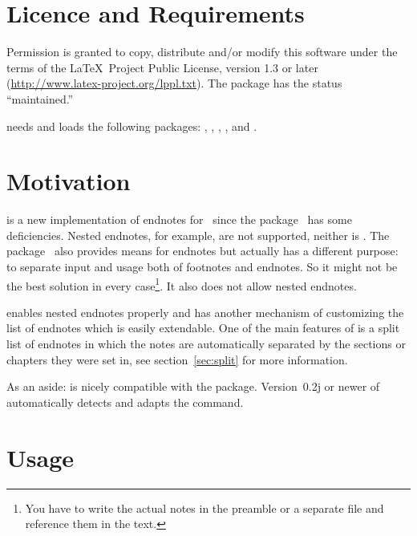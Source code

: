 \documentclass[toc=bib,toc=index]{cnpkgdoc}
\begin{document}
\section{Licence and Requirements}
Permission is granted to copy, distribute and/or modify this software under the
terms of the \LaTeX\ Project Public License, version 1.3 or later
(\url{http://www.latex-project.org/lppl.txt}). The package has the status
``maintained.''

\enotez needs and loads the following packages: , ,
, ,  and .

\section{Motivation}
\enotez is a new implementation of endnotes for \LaTeXe\ since the 
package~\cite{endnotes} has some deficiencies. Nested endnotes, for example, are
not supported, neither is . The  package~\cite{sepfootnotes}
also provides means for endnotes but actually has a different purpose: to
separate input and usage both of footnotes and endnotes. So it might not be the
best solution in every case\footnote{You have to write the actual notes in the
preamble or a separate file and reference them in the text.}. It also does not
allow nested endnotes.

\enotez enables nested endnotes properly and has another mechanism of customizing
the list of endnotes which is easily extendable. One of the main features  of
\enotez is a split list of endnotes in which the notes are automatically
separated by the sections or chapters they were set in, see section~\ref{sec:split}
for more information.

As an aside: \enotez is nicely compatible with the  package.
Version~0.2j or newer of  automatically detects \enotez and adapts
the  command.

\section{Usage}
\end{document}
